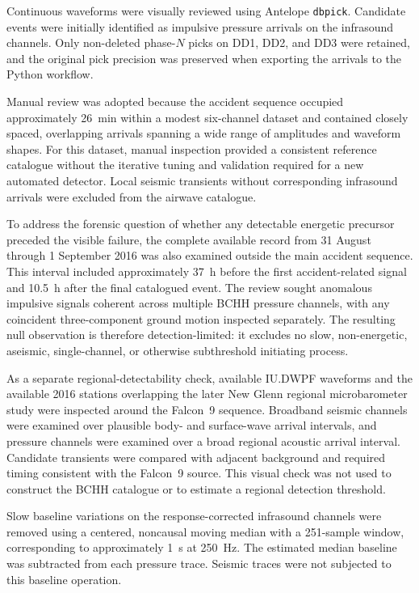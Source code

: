 \documentclass[]{seismica}
\begin{document}
Continuous waveforms were visually reviewed using Antelope \texttt{dbpick}. Candidate events were initially identified as impulsive pressure arrivals on the infrasound channels. Only non-deleted phase-$N$ picks on DD1, DD2, and DD3 were retained, and the original pick precision was preserved when exporting the arrivals to the Python workflow.

Manual review was adopted because the accident sequence occupied approximately 26~min within a modest six-channel dataset and contained closely spaced, overlapping arrivals spanning a wide range of amplitudes and waveform shapes. For this dataset, manual inspection provided a consistent reference catalogue without the iterative tuning and validation required for a new automated detector. Local seismic transients without corresponding infrasound arrivals were excluded from the airwave catalogue.

To address the forensic question of whether any detectable energetic precursor
preceded the visible failure, the complete available record from 31 August
through 1 September 2016 was also examined outside the main accident sequence.
This interval included approximately 37~h before the first accident-related
signal and 10.5~h after the final catalogued event. The review sought anomalous
impulsive signals coherent across multiple BCHH pressure channels, with any
coincident three-component ground motion inspected separately. The resulting
null observation is therefore detection-limited: it excludes no slow,
non-energetic, aseismic, single-channel, or otherwise subthreshold initiating
process.

As a separate regional-detectability check, available IU.DWPF waveforms and
the available 2016 stations overlapping the later New Glenn regional
microbarometer study were inspected around the Falcon~9 sequence. Broadband
seismic channels were examined over plausible body- and surface-wave arrival
intervals, and pressure channels were examined over a broad regional acoustic
arrival interval. Candidate transients were compared with adjacent background
and required timing consistent with the Falcon~9 source. This visual check was
not used to construct the BCHH catalogue or to estimate a regional detection
threshold.

Slow baseline variations on the response-corrected infrasound channels were removed using a centered, noncausal moving median with a 251-sample window, corresponding to approximately 1~s at 250~Hz. The estimated median baseline was subtracted from each pressure trace. Seismic traces were not subjected to this baseline operation.
\end{document}
